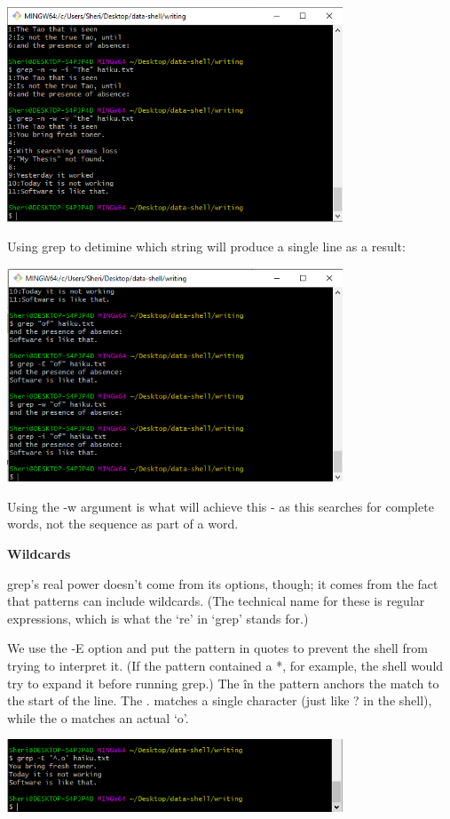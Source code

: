 \documentclass{article}
\begin{document}
\includegraphics[width=10cm]{Images/GitBash_064.PNG}


Using grep to detimine which string will produce a single line as a result:

\includegraphics[width=10cm]{Images/GitBash_065.PNG}

Using the -w argument is what will achieve this - as this searches for complete words, not the sequence as part of a word.

\textbf{Wildcards}

grep’s real power doesn’t come from its options, though; it comes from the fact that patterns can include wildcards. (The technical name for these is regular expressions, which is what the ‘re’ in ‘grep’ stands for.)

We use the -E option and put the pattern in quotes to prevent the shell from trying to interpret it. (If the pattern contained a *, for example, the shell would try to expand it before running grep.) The \^ in the pattern anchors the match to the start of the line. The . matches a single character (just like ? in the shell), while the o matches an actual `o'.

\includegraphics[width=10cm]{Images/GitBash_066.PNG}
\end{document}
